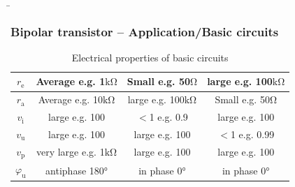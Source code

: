 \begin{frame}
    \b{ \frametitle{Bipolar transistor -- Application/Basic circuits}
        \begin{table}[H]
            \centering
            \begin{tabular}{|c|c|c|c|}
                \hline
                $r_\mathrm{e}$ & Average e.g. 1$\mathrm{k \Omega}$ & Small e.g. 50$\mathrm{\Omega}$ & large e.g. 100$\mathrm{k \Omega}$ \\
                \hline
                $r_\mathrm{a}$ & Average e.g. 10$\mathrm{k \Omega}$ & large e.g. 100$\mathrm{k \Omega}$ & Small e.g. 50$\mathrm{\Omega}$ \\
                \hline
                $v_\mathrm{i}$ & large e.g. 100 & $<$1 e.g. 0.9 &  large e.g. 100 \\
                \hline
                $v_\mathrm{u}$ & large e.g. 100 &  large e.g. 100 & $<$1 e.g. 0.99 \\
                \hline
                $v_\mathrm{p}$ & very large e.g. 1$\mathrm{k \Omega}$ &  large e.g. 100 & large e.g. 100 \\
                \hline
                $\varphi_\mathrm{u}$ & antiphase 180° & in phase 0° & in phase 0° \\
                \hline
            \end{tabular}
            \caption{Electrical properties of basic circuits}
        \end{table}
    }
\end{frame}


